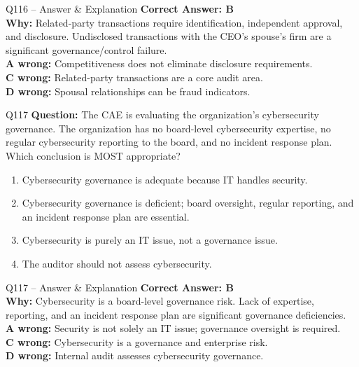 \documentclass[aspectratio=169,10pt]{beamer}
\begin{document}
	\begin{frame}[t]{Q116 -- Answer \& Explanation}
		\small
		\textbf{Correct Answer: B} \\[4pt]
		\textbf{Why:} Related-party transactions require identification, independent approval, and disclosure. Undisclosed transactions with the CEO's spouse's firm are a significant governance/control failure. \\[4pt]
		\textbf{A wrong:} Competitiveness does not eliminate disclosure requirements. \\[2pt]
		\textbf{C wrong:} Related-party transactions are a core audit area. \\[2pt]
		\textbf{D wrong:} Spousal relationships can be fraud indicators.
	\end{frame}
	
	\begin{frame}[t]{Q117}
		\small
		\textbf{Question:} The CAE is evaluating the organization's cybersecurity governance. The organization has no board-level cybersecurity expertise, no regular cybersecurity reporting to the board, and no incident response plan. Which conclusion is MOST appropriate?
		\begin{enumerate}[label=\Alph*.,itemsep=1pt,topsep=2pt]
			\item Cybersecurity governance is adequate because IT handles security.
			\item Cybersecurity governance is deficient; board oversight, regular reporting, and an incident response plan are essential.
			\item Cybersecurity is purely an IT issue, not a governance issue.
			\item The auditor should not assess cybersecurity.
		\end{enumerate}
	\end{frame}
	
	\begin{frame}[t]{Q117 -- Answer \& Explanation}
		\small
		\textbf{Correct Answer: B} \\[4pt]
		\textbf{Why:} Cybersecurity is a board-level governance risk. Lack of expertise, reporting, and an incident response plan are significant governance deficiencies. \\[4pt]
		\textbf{A wrong:} Security is not solely an IT issue; governance oversight is required. \\[2pt]
		\textbf{C wrong:} Cybersecurity is a governance and enterprise risk. \\[2pt]
		\textbf{D wrong:} Internal audit assesses cybersecurity governance.
	\end{frame}
	
\end{document}
